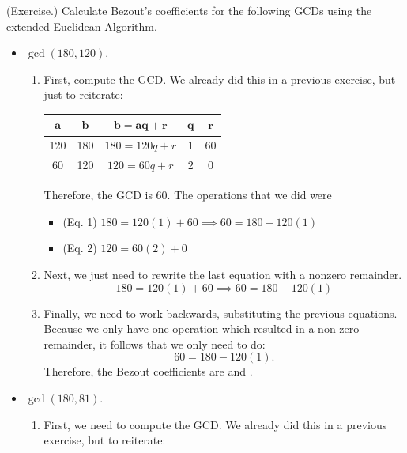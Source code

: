 \documentclass[letterpaper]{article}
\begin{document}
\begin{mdframed}
    (Exercise.) Calculate Bezout's coefficients for the following GCDs using the extended Euclidean Algorithm.
    \begin{itemize}
        \item $\gcd(180, 120).$
        \begin{mdframed}
            \begin{enumerate}
                \item First, compute the GCD. We already did this in a previous exercise, but just to reiterate: 
                \begin{center}
                    \begin{tabular}{|c|c|c|c|c|}
                        \hline 
                        $\mathbf{a}$ & $\mathbf{b}$ & $\mathbf{b = aq + r}$ & $\mathbf{q}$ & $\mathbf{r}$ \\ 
                        \hline 
                        120 & 180 & $180 = 120q + r$ & 1   & 60 \\ 
                        60  & 120 & $120 = 60q + r$  & 2   & 0  \\ 
                        \hline 
                    \end{tabular}
                \end{center}
                Therefore, the GCD is 60. The operations that we did were 
                \begin{itemize}
                    \item (Eq. 1) $180 = 120(1) + 60 \implies 60 = 180 - 120(1)$
                    \item (Eq. 2) $120 = 60(2) + 0$
                \end{itemize}


                \item Next, we just need to rewrite the last equation with a nonzero remainder. 
                \[180 = 120(1) + 60 \implies 60 = 180 - 120(1)\]

                \item Finally, we need to work backwards, substituting the previous equations. Because we only have one operation which resulted in a non-zero remainder, it follows that we only need to do: 
                \[60 = 180 - 120(1).\]
                Therefore, the Bezout coefficients are  and .
            \end{enumerate}
        \end{mdframed}
        \item $\gcd(180, 81).$
        \begin{mdframed}
            \begin{enumerate}
                \item First, we need to compute the GCD. We already did this in a previous exercise, but to reiterate: 
                

\end{enumerate}
\end{mdframed}
\end{itemize}
\end{mdframed}
\end{document}
